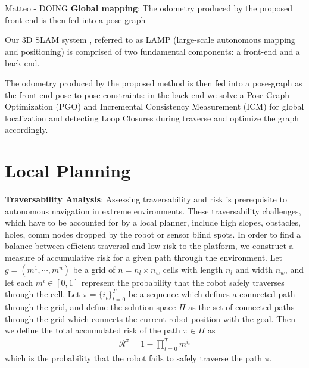 \documentclass[a4paper, 10pt, conference]{ieeeconf}      %
\newcommand{\ph}[1]{{\textbf{#1}:}} %
\newcommand{\todo}[1]{{\color{red} #1 }} %
\begin{document}
\todo{Matteo - DOING} \ph{Global mapping}
The odometry produced by the proposed front-end is then fed into a pose-graph

Our 3D SLAM system \cite{Ebadi2020}, referred to as LAMP (large-scale autonomous mapping and positioning) is comprised of two fundamental components: a front-end and a back-end. 

The odometry produced by the proposed method is then fed into a pose-graph as the front-end pose-to-pose constraints: in the back-end we solve a Pose Graph Optimization (PGO) and Incremental Consistency Measurement (ICM) for global localization and detecting Loop Closures during traverse and optimize the graph accordingly. 

\section{Local Planning}\label{sec:local_planning}

\ph{Traversability Analysis}
Assessing traversability and risk is prerequisite to autonomous navigation in extreme environments.  These traversability challenges, which have to be accounted for by a local planner, include high slopes, obstacles, holes, comm nodes dropped by the robot or sensor blind spots.  In order to find a balance between efficient traversal and low risk to the platform, we construct a measure of accumulative risk for a given path through the environment.  Let $g=(m^1,\cdots,m^n)$ be a grid of $n=n_l\times n_w$ cells with length $n_l$ and width $n_w$, and let each $m^i\in[0,1]$ represent the probability that the robot safely traverses through the cell.  Let $\pi=\{i_t\}_{t=0}^T$ be a sequence which defines a connected path through the grid, and define the solution space $\Pi$ as the set of connected paths through the grid which connects the current robot position with the goal.  Then we define the total accumulated risk of the path $\pi\in\Pi$ as 
\begin{align}
 \mathcal{R}^{\pi}=1-\prod_{t=0}^Tm^{i_t}
\end{align}
which is the probability that the robot fails to safely traverse the path $\pi$.  
\end{document}
